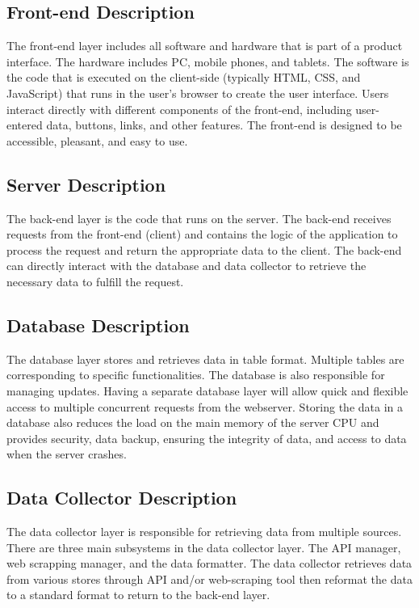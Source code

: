 \subsection{Front-end Description}
The front-end layer includes all software and hardware that is part of a product interface. The hardware includes PC, mobile phones, and tablets. The software is the code that is executed on the client-side (typically HTML, CSS, and JavaScript) that runs in the user's browser to create the user interface. Users interact directly with different components of the front-end, including user-entered data, buttons, links, and other features. The front-end is designed to be accessible, pleasant, and easy to use.

\subsection{Server Description}
The back-end layer is the code that runs on the server. The back-end receives requests from the front-end (client) and contains the logic of the application to process the request and return the appropriate data to the client. The back-end can directly interact with the database and data collector to retrieve the necessary data to fulfill the request. 

\subsection{Database Description}
The database layer stores and retrieves data in table format. Multiple tables are corresponding to specific functionalities. The database is also responsible for managing updates. Having a separate database layer will allow quick and flexible access to multiple concurrent requests from the webserver. Storing the data in a database also reduces the load on the main memory of the server CPU and provides security, data backup,  ensuring the integrity of data, and access to data when the server crashes.

\subsection{Data Collector Description}
The data collector layer is responsible for retrieving data from multiple sources. There are three main subsystems in the data collector layer. The API manager, web scrapping manager, and the data formatter. The data collector retrieves data from various stores through API and/or web-scraping tool then reformat the data to a standard format to return to the back-end layer.
